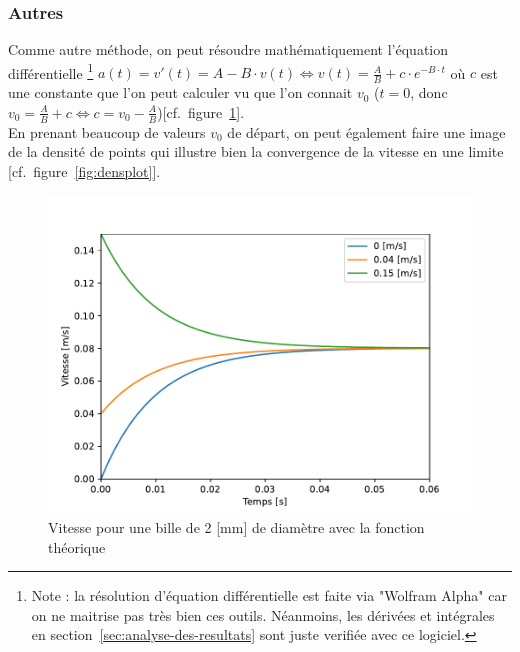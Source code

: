 \subsubsection{Autres}
Comme autre méthode, on peut résoudre mathématiquement l'équation différentielle \footnote{Note :
la résolution d'équation différentielle est faite via "Wolfram Alpha" car on ne maitrise pas très
bien ces outils. Néanmoins, les dérivées et intégrales en section~\ref{sec:analyse-des-resultats} sont juste
verifiée avec ce logiciel.} $a(t)= v'(t) = A - B \cdot v(t) \Longleftrightarrow v(t) = \frac{A}{B}+c \cdot
e^{-B\cdot t} $ où $c$ est une constante que l'on peut calculer vu que l'on connait $v_{0}$
($t=0$, donc $v_{0} = \frac{A}{B}+c \Longleftrightarrow c = v_{0}- \frac{A}{B}$)[cf.\ figure~\ref{fig:ray3_th}].\\
En prenant beaucoup de valeurs $v_{0}$ de départ, on peut également faire une image de la densité de
points qui illustre bien la convergence de la vitesse en une limite [cf.\ figure~\ref{fig:densplot}].\\
\begin{minipage}{0.475\textwidth}
    \begin{figure}[H]
        \centering
        \includegraphics[scale=0.54]{graph/ray3_th}
        \caption{Vitesse pour une bille de 2 [mm] de diamètre avec la fonction théorique}
        \label{fig:ray3_th}
    \end{figure}
\end{minipage}
\begin{minipage}{0.05\textwidth}
\end{minipage}

